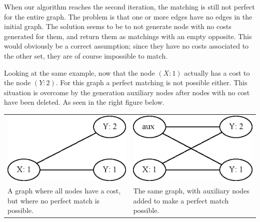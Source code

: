 \documentclass[11pt]{article}
\begin{document}
\endgroup

When our algorithm reaches the second iteration, the matching is still not perfect for the entire graph. The problem is that one or more edges have no edges in the initial graph. The solution seems to be to not generate node with no costs generated for them, and return them as matchings with an empty opposite. This would obviously be a correct assumption; since they have no costs associated to the other set, they are of course impossible to match.

Looking at the same example, now that the node $(X: 1)$ actually has a cost to the node $(Y: 2)$. For this graph a perfect matching is not possible either. This situation is overcome by the generation auxiliary nodes after nodes with no cost have been deleted. As seen in the right figure below. \\

\begingroup
    \fontsize{7pt}{10pt}\selectfont
\begin{tabular}{ p{5.5cm} | p{5.5cm} }
   \centerline{\includegraphics[scale=0.3]{drawings/eps/TwoWayCostMatchingNotPerfect/NoFakeNode.eps}} &
    \centerline{\includegraphics[scale=0.3]{drawings/eps/TwoWayCostMatchingNotPerfect/FakeNode.eps}} \\
   A graph where all nodes have a cost, but where no perfect match is possible. &
    The same graph, with auxiliary nodes added to make a perfect match possible. \\ 
\end{tabular}
\end{document}
